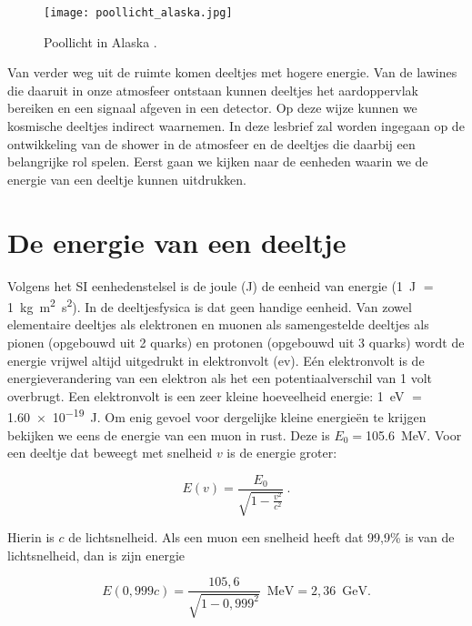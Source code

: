 \begin{figure}
    \centering
    \texttt{[image: poollicht\_alaska.jpg]}
    \caption{Poollicht in Alaska \cite{strang}.}
    \label{fig:poollicht}
\end{figure}

Van verder weg uit de ruimte komen deeltjes met hogere energie. Van de
lawines die daaruit in onze atmosfeer ontstaan kunnen deeltjes het
aardoppervlak bereiken en een signaal afgeven in een \hisparc detector.
Op deze wijze kunnen we kosmische deeltjes indirect waarnemen. In deze
lesbrief zal worden ingegaan op de ontwikkeling van de shower in de
atmosfeer en de deeltjes die daarbij een belangrijke rol spelen. Eerst
gaan we kijken naar de eenheden waarin we de energie van een deeltje
kunnen uitdrukken. 


\section{De energie van een deeltje}

Volgens het SI eenhedenstelsel is de joule (J) de eenheid van energie
(\SI{1}{\joule} $=$ \SI{1}{\kilo\gram\square\meter\square\second}). In
de deeltjesfysica is dat geen handige eenheid. Van zowel elementaire
deeltjes als elektronen en muonen als samengestelde deeltjes als pionen
(opgebouwd uit 2 quarks) en protonen (opgebouwd uit 3 quarks) wordt de
energie vrijwel altijd uitgedrukt in elektronvolt (ev). Eén elektronvolt
is de energieverandering van een elektron als het een potentiaalverschil
van 1 volt overbrugt. Een elektronvolt is een zeer kleine hoeveelheid
energie: \SI{1}{\electronvolt} $=$ \SI{1,60e-19}{\joule}. Om enig gevoel
voor dergelijke kleine energie\"en te krijgen bekijken we eens de
energie van een muon in rust. Deze is
$E_0=$\SI{105,6}{\mega\electronvolt}. Voor een deeltje dat beweegt met
snelheid $v$ is de energie groter:

\begin{equation}
E(v)=\frac{E_0}{\sqrt{1-\frac{v^2}{c^2}}} \ . \nonumber
\end{equation}

Hierin is $c$ de lichtsnelheid. Als een muon een snelheid heeft dat
99,9\% is van de lichtsnelheid, dan is zijn energie 

\begin{equation}
E(0,999c)=\frac{105,6}{\sqrt{1-0,999^2}} \, \textrm{ MeV} =2,36 \, \textrm{ GeV}. \nonumber
\end{equation}

